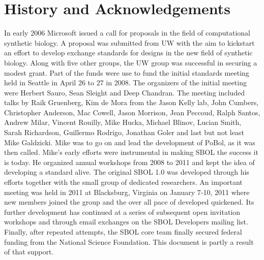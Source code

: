 \section{History and Acknowledgements}

In early 2006 Microsoft issued a call for proposals in the field of computational synthetic biology. A proposal was submitted from UW with the aim to kickstart an effort to develop exchange standards for designs in the new field of synthetic biology. Along with five other groups, the UW group was successful in securing a modest grant. Part of the funds were use to fund the initial standards meeting held in Seattle in April 26 to 27 in 2008. The organizers of the initial meeting were Herbert Sauro, Sean Sleight and Deep Chandran. The meeting included talks by Raik Gruenberg,  Kim de Mora from the Jason Kelly lab, John Cumbers,  Christopher Anderson, Mac Cowell, Jason Morrison, Jean Peccoud, Ralph Santos, Andrew Milar, Vincent Rouilly, Mike Hucka, Michael Blinov, Lucian Smith, Sarah Richardson, Guillermo Rodrigo, Jonathan Goler and last but not least Mike Galdzicki. Mike was to go on and lead the development of PoBol, as it was then called. Mike's early efforts were instrumental in making SBOL the success it is today. He organized annual workshops from 2008 to 2011 and kept the idea of developing a standard alive. The original SBOL 1.0 was developed through his efforts together with the small group of dedicated researchers. An important meeting was held in 2011 at Blacksburg, Virginia on January 7-10, 2011 where new members joined the group and the over all pace of developed quickened. Its further development has continued at a series of subsequent open invitation workshops and through email exchanges on the SBOL Developers mailing list. Finally, after repeated attempts, the SBOL core team finally secured federal funding from the National Science Foundation. This document is partly a result of that support.  




